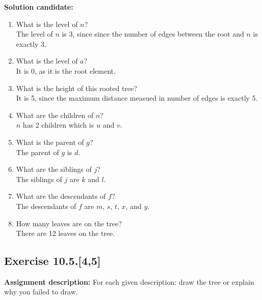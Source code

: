 \documentclass{report}
\newcommand{\AssignmentDescription}{\textbf{Assignment description: }}
\newcommand{\Solution}{\textbf{Solution candidate: }}
\newcommand{\Exercise}[1]{\subsection{Exercise #1}}
\newcommand{\defaultEnumerateLabel}{\textbf{\alph*.}}
\newcommand{\MyItem}[1]{\item #1\\}
\begin{document}
	\Solution
	\begin{enumerate}[label=\defaultEnumerateLabel]
		\MyItem{What is the level of $n$?}
		
		The level of $n$ is 3, since since the number of edges between the root and $n$ is exactly 3.
		\MyItem{What is the level of $a$?}
		
		It is 0, as it is the root element.
		
		\MyItem{What is the height of this rooted tree?}
		
		It is 5, since the maximum distance measued in number of edges is exactly 5.
		\MyItem{What are the children of $n$?}
		
		$n$ has 2 children which is $u$ and $v$.
		
		\MyItem{What is the parent of $g$?}
		
		The parent of $g$ is $d$.
		
		\MyItem{What are the siblings of $j$?}
		
		The siblings of $j$ are $k$ and $l$.
		
		\MyItem{What are the descendants of $f$?}
		
		The descendants of $f$ are $m$, $s$, $t$, $x$, and $y$.
		\MyItem{How many leaves are on the tree?}
		
		There are 12 leaves on the tree.
	\end{enumerate}
	
	\Exercise{10.5.[4,5]}
	\AssignmentDescription
	For each given description: draw the tree or explain why you failed to draw.\\
	
\end{document}
